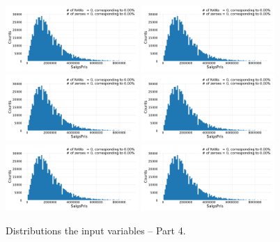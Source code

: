 \begin{figure}
  \subfloat{\qquad}
  \includegraphics[draft=false, width=0.45\textwidth, page=43, trim=15 0 15 0, clip]{figures/housing/overview_fig.pdf}\hfil
  \subfloat{\qquad}
  \includegraphics[draft=false, width=0.45\textwidth, page=44, trim=15 0 15 0, clip]{figures/housing/overview_fig.pdf}
  \subfloat{\qquad}
  \includegraphics[draft=false, width=0.45\textwidth, page=45, trim=15 0 15 0, clip]{figures/housing/overview_fig.pdf}\hfil
  \subfloat{\qquad}
  \includegraphics[draft=false, width=0.45\textwidth, page=46, trim=15 0 15 0, clip]{figures/housing/overview_fig.pdf}
  \subfloat{\qquad}
  \includegraphics[draft=false, width=0.45\textwidth, page=47, trim=15 0 15 0, clip]{figures/housing/overview_fig.pdf}\hfil
  \subfloat{\qquad}
  \includegraphics[draft=false, width=0.45\textwidth, page=48, trim=15 0 15 0, clip]{figures/housing/overview_fig.pdf}
  \caption[Distributions of the Input Variables -- Part 4]{Distributions the input variables -- Part 4.}
  \label{fig:h:variable_overview_all_4}
  \vspace{\abovecaptionskip}
\end{figure}

